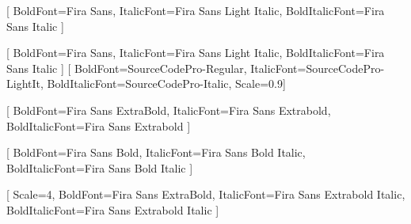 \RequirePackage{fontspec}
\RequirePackage{amssymb}

[
  BoldFont={Fira Sans},
  ItalicFont={Fira Sans Light Italic},
  BoldItalicFont={Fira Sans Italic}
]

\setsansfont{Fira Sans Light}[
  BoldFont={Fira Sans},
  ItalicFont={Fira Sans Light Italic},
  BoldItalicFont={Fira Sans Italic}
]
\setmonofont{SourceCodePro-Light}[
  BoldFont={SourceCodePro-Regular},
  ItalicFont={SourceCodePro-LightIt},
  BoldItalicFont={SourceCodePro-Italic},
  Scale=0.9]

[
  BoldFont={Fira Sans ExtraBold},
  ItalicFont={Fira Sans Extrabold},
  BoldItalicFont={Fira Sans Extrabold}
]

[
  BoldFont={Fira Sans Bold},
  ItalicFont={Fira Sans Bold Italic},
  BoldItalicFont={Fira Sans Bold Italic}
]

[
  Scale=4,
  BoldFont={Fira Sans ExtraBold},
  ItalicFont={Fira Sans Extrabold Italic},
  BoldItalicFont={Fira Sans Extrabold Italic}
]